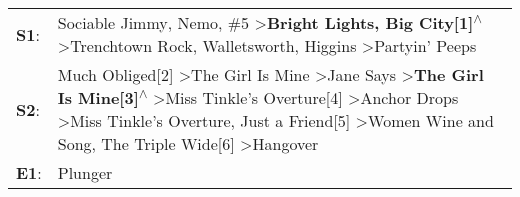 \begin{supertabular}{p{0.03\textwidth}p{0.92\textwidth}}
 \textbf{S1}:  &                                                                                                                                                                                                                                         Sociable Jimmy\textsuperscript{}, \enspace Nemo\textsuperscript{}, \enspace \#5\textsuperscript{} \textgreater \enspace \textbf{Bright Lights, Big City[1]\textsuperscript{$\wedge$}} \textgreater \enspace Trenchtown Rock\textsuperscript{}, \enspace Walletsworth\textsuperscript{}, \enspace Higgins\textsuperscript{} \textgreater \enspace Partyin' Peeps\textsuperscript{}  \enspace  \\
 \textbf{S2}:  &  Much Obliged[2]\textsuperscript{} \textgreater \enspace The Girl Is Mine\textsuperscript{} \textgreater \enspace Jane Says\textsuperscript{} \textgreater \enspace \textbf{The Girl Is Mine[3]\textsuperscript{$\wedge$}} \textgreater \enspace Miss Tinkle's Overture[4]\textsuperscript{} \textgreater \enspace Anchor Drops\textsuperscript{} \textgreater \enspace Miss Tinkle's Overture\textsuperscript{}, \enspace Just a Friend[5]\textsuperscript{} \textgreater \enspace Women Wine and Song\textsuperscript{}, \enspace The Triple Wide[6]\textsuperscript{} \textgreater \enspace Hangover\textsuperscript{}  \enspace  \\
 \textbf{E1}:  &                                                                                                                                                                                                                                                                                                                                                                                                                                                                                                                                                                                                 Plunger\textsuperscript{}  \enspace  \\
\end{supertabular}
